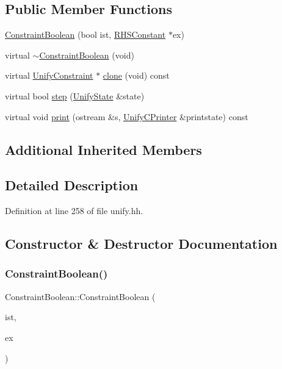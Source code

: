 \subsection*{Public Member Functions}
\begin{DoxyCompactItemize}
\item 
\mbox{\hyperlink{class_constraint_boolean_ad74ce76959983eefb4c7cba1f3ccf353}{Constraint\+Boolean}} (bool ist, \mbox{\hyperlink{class_r_h_s_constant}{R\+H\+S\+Constant}} $\ast$ex)
\item 
virtual \mbox{\hyperlink{class_constraint_boolean_a2b7fbb518bbd7819780e645090284c69}{$\sim$\+Constraint\+Boolean}} (void)
\item 
virtual \mbox{\hyperlink{class_unify_constraint}{Unify\+Constraint}} $\ast$ \mbox{\hyperlink{class_constraint_boolean_a3b258aaef6abed8c36455b562016cfbc}{clone}} (void) const
\item 
virtual bool \mbox{\hyperlink{class_constraint_boolean_af67fc020025d19e97b82dd7c7483cf1a}{step}} (\mbox{\hyperlink{class_unify_state}{Unify\+State}} \&state)
\item 
virtual void \mbox{\hyperlink{class_constraint_boolean_a0cee08ca55cc80bd120ea52e8e52f290}{print}} (ostream \&s, \mbox{\hyperlink{class_unify_c_printer}{Unify\+C\+Printer}} \&printstate) const
\end{DoxyCompactItemize}
\subsection*{Additional Inherited Members}


\subsection{Detailed Description}


Definition at line 258 of file unify.\+hh.



\subsection{Constructor \& Destructor Documentation}
\mbox{\label{class_constraint_boolean_ad74ce76959983eefb4c7cba1f3ccf353}} 
\subsubsection{\texorpdfstring{ConstraintBoolean()}{ConstraintBoolean()}}
{\footnotesize\ttfamily Constraint\+Boolean\+::\+Constraint\+Boolean (\begin{DoxyParamCaption}\item[{bool}]{ist,  }\item[{\mbox{\hyperlink{class_r_h_s_constant}{R\+H\+S\+Constant}} $\ast$}]{ex }\end{DoxyParamCaption})\hspace{0.3cm}{\ttfamily [inline]}}



